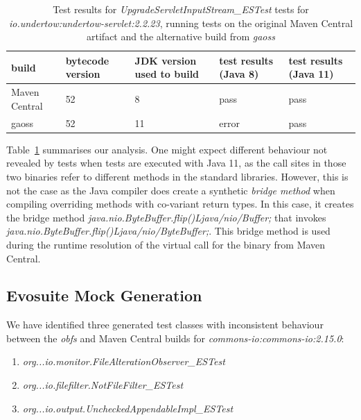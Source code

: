 \documentclass[conference]{IEEEtran}
\begin{document}
\begin{table}[h]
	\begin{tabular}{|p{1.8cm}p{0.9cm}p{1.5cm}p{1.2cm}p{1.2cm}|}
		\hline
		build         & bytecode version & JDK version used to build & test results (Java 8)                                                    & test results (Java 11) \\ \hline 
		Maven Central & 52               & 8                         & pass                                                                     & pass                   \\
		gaoss         & 52               & 11                        & error & pass                  \\ \hline
	\end{tabular}
	\caption{Test results for \textit{UpgradeServletInputStream\_ESTest} tests for  \textit{io.undertow:undertow-servlet:2.2.23}, running tests on the original Maven Central artifact and the alternative build from \textit{gaoss}}
	\label{tab:nosuchmethoderror}
\end{table}

Table~\ref{tab:nosuchmethoderror} summarises our analysis. One might expect different behaviour not revealed by tests when tests are executed with Java 11, as the call sites in those two binaries refer to different methods in the standard libraries. However, this is not the case as the Java compiler does create a synthetic \textit{bridge method} when compiling overriding methods with co-variant return types. In this case, it creates the bridge method \textit{java.nio.ByteBuffer.flip()Ljava/nio/Buffer;}  that invokes \textit{java.nio.ByteBuffer.flip()Ljava/nio/ByteBuffer;}. This bridge method is used during the  runtime resolution of the virtual call for the binary from Maven Central.  


\subsection{Evosuite Mock Generation}


We have identified three generated test classes with inconsistent behaviour between the \textit{obfs} and Maven Central builds for \textit{commons-io:commons-io:2.15.0}: 
\begin{enumerate}
	\item  \textit{org...io.monitor.FileAlterationObserver\_ESTest}
    \item \textit{org...io.filefilter.NotFileFilter\_ESTest}
    \item  \textit{org...io.output.UncheckedAppendableImpl\_ESTest}
\end{enumerate}
\end{document}

